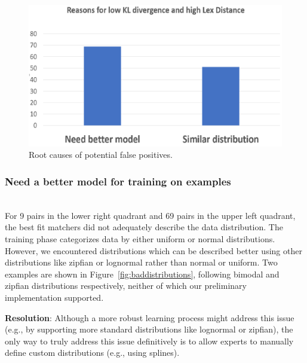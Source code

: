 \begin{figure}
	\centering
	\includegraphics[width=\columnwidth]{graphics/Upper_left_quad}
	\caption{Root causes of potential false positives.}
	\label{fig:datatags:upperleft}
	\trimfigurespacing
\end{figure}

\smallskip
\subsubsection{Need a better model for training on examples}~\\
For 9 pairs in the lower right quadrant and 69 pairs in the upper left quadrant, the best fit matchers did not adequately describe the data distribution.
The training phase categorizes data by either uniform or normal distributions. 
However, we encountered distributions which can be described better using other distributions like zipfian or lognormal rather than normal or uniform.
Two examples are shown in Figure~\ref{fig:baddistributions}, following bimodal and zipfian distributions respectively, neither of which our preliminary implementation supported.

\textbf{Resolution}: Although a more robust learning process might address this issue (e.g., by supporting more standard distributions like lognormal or zipfian), the only way to truly address this issue definitively is to allow experts to manually define custom distributions (e.g., using splines).

